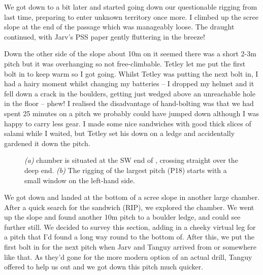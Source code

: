 We got down to  a bit later and started going down our questionable rigging from last time, preparing to enter unknown territory once more. I climbed up the scree slope at the end of the passage which was manageably loose. The draught continued, with Jarv's PSS paper gently fluttering in the breeze! 

Down the other side of the slope about 10m on it seemed there was a short 2-3m pitch but it was overhanging so not free-climbable. Tetley let me put the first bolt in to keep warm so I got going. Whilst Tetley was putting the next bolt in, I had a hairy moment whilst changing my batteries – I dropped my helmet and it fell down a crack in the boulders, getting just wedged above an unreachable hole in the floor – phew! I realised the disadvantage of hand-bolting was that we had spent 25 minutes on a pitch we probably could have jumped down although I was happy to carry less gear. I made some nice sandwiches with good thick slices of salami while I waited, but Tetley set his down on a ledge and accidentally gardened it down the pitch. 

\begin{figure*}[t!]
	\checkoddpage \ifoddpage \forcerectofloat \else \forceversofloat \fi
	\centering
	\begin{subfigure}[t]{0.6337\textwidth}
		\centering
		 \caption{}\label{hammerhead passage}
	\end{subfigure}
  	 \hfill
   	 \begin{subfigure}[t]{0.3563\textwidth}
        		\centering
        		\caption{} \label{hammerhead pitch}
        \end{subfigure}
	\caption{
	 	  \textit{(a)} \protect{} chamber is situated at the SW end of \protect{}, crossing straight over the deep end.  
   		 \textit{(b)} The rigging of the largest \protect{} pitch (P18) starts with a small window on the left-hand side. }
\end{figure*}

We got down and landed at the bottom of a scree slope in another large chamber. After a quick search for the sandwich (RIP), we explored the chamber. We went up the slope and found another 10m pitch to a boulder ledge, and could see further still.  We decided to survey this section, adding in a cheeky virtual leg for a pitch that I'd found a long way round to the bottom of. After this, we put the first bolt in for the next pitch when Jarv and Tanguy arrived from  or somewhere like that. As they'd gone for the more modern option of an actual drill, Tanguy offered to help us out and we got down this pitch much quicker. 

